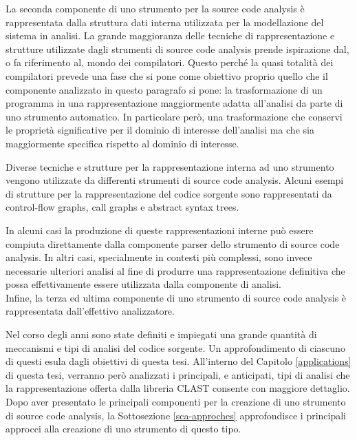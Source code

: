 La seconda componente di uno strumento per la source code analysis è
rappresentata dalla struttura dati interna utilizzata per la modellazione del
sistema in analisi. La grande maggioranza delle tecniche di rappresentazione e
strutture utilizzate dagli strumenti di source code analysis prende ispirazione
dal, o fa riferimento al, mondo dei compilatori. Questo perché la quasi totalità
dei compilatori prevede una fase che si pone come obiettivo proprio quello che
il componente analizzato in questo paragrafo si pone: la trasformazione di un
programma in una rappresentazione maggiormente adatta all’analisi da parte di
uno strumento automatico. In particolare però, una trasformazione che conservi
le proprietà significative per il dominio di interesse dell'analisi ma che sia
maggiormente specifica rispetto al dominio di interesse.

Diverse tecniche e strutture per la rappresentazione interna ad uno strumento
vengono utilizzate da differenti strumenti di source code analysis. Alcuni
esempi di strutture per la rappresentazione del codice sorgente sono
rappresentati da control-flow graphs, call graphs e abstract syntax trees.

In alcuni casi la produzione di queste rappresentazioni interne può essere
compiuta direttamente dalla componente parser dello strumento di source code
analysis. In altri casi, specialmente in contesti più complessi, sono invece
necessarie ulteriori analisi al fine di produrre una rappresentazione definitiva
che possa effettivamente essere utilizzata dalla componente di analisi.\\

Infine, la terza ed ultima componente di uno strumento di source code analysis è
rappresentata dall’effettivo analizzatore.

Nel corso degli anni sono state definiti e impiegati una grande quantità di
meccanismi e tipi di analisi del codice sorgente. Un approfondimento di ciascuno
di questi esula dagli obiettivi di questa tesi. All’interno del Capitolo
\ref{applications} di questa tesi, verranno però analizzati i principali, e
anticipati, tipi di analisi che la rappresentazione offerta dalla libreria CLAST
consente con maggiore dettaglio.\\

Dopo aver presentato le principali componenti per la creazione di uno strumento
di source code analysis, la Sottosezione \ref{sca-approches} approfondisce i
principali approcci alla creazione di uno strumento di questo tipo.

